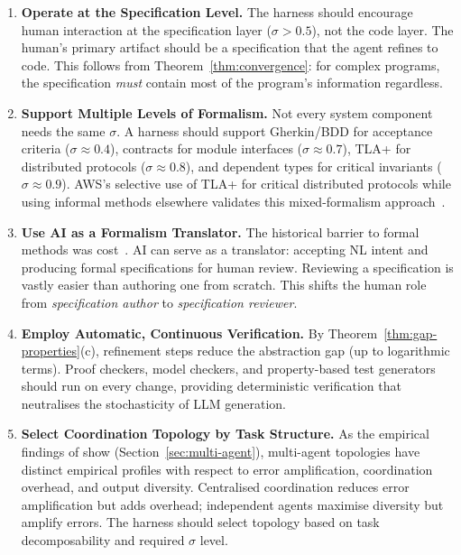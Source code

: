 \documentclass[11pt, a4paper, copyright]{googledeepmind}
\begin{document}
\begin{enumerate}
    \item \textbf{Operate at the Specification Level.} The harness should encourage human interaction at the specification layer ($\sigma > 0.5$), not the code layer. The human's primary artifact should be a specification that the agent refines to code. This follows from Theorem~\ref{thm:convergence}: for complex programs, the specification \emph{must} contain most of the program's information regardless.

    \item \textbf{Support Multiple Levels of Formalism.} Not every system component needs the same $\sigma$. A harness should support Gherkin/BDD for acceptance criteria ($\sigma \approx 0.4$), contracts for module interfaces ($\sigma \approx 0.7$), TLA+ for distributed protocols ($\sigma \approx 0.8$), and dependent types for critical invariants ($\sigma \approx 0.9$). AWS's selective use of TLA+ for critical distributed protocols while using informal methods elsewhere validates this mixed-formalism approach~\citep{newcombe2015amazon}.

    \item \textbf{Use AI as a Formalism Translator.} The historical barrier to formal methods was cost~\citep{kleppmann2025formal}. AI can serve as a translator: accepting NL intent and producing formal specifications for human review. Reviewing a specification is vastly easier than authoring one from scratch. This shifts the human role from \emph{specification author} to \emph{specification reviewer}.

    \item \textbf{Employ Automatic, Continuous Verification.} By Theorem~\ref{thm:gap-properties}(c), refinement steps reduce the abstraction gap (up to logarithmic terms). Proof checkers, model checkers, and property-based test generators should run on every change, providing deterministic verification that neutralises the stochasticity of LLM generation.

    \item \textbf{Select Coordination Topology by Task Structure.} As the empirical findings of \citet{kim2025scaling} show (Section~\ref{sec:multi-agent}), multi-agent topologies have distinct empirical profiles with respect to error amplification, coordination overhead, and output diversity. Centralised coordination reduces error amplification but adds overhead; independent agents maximise diversity but amplify errors. The harness should select topology based on task decomposability and required $\sigma$ level.


\end{enumerate}
\end{document}
